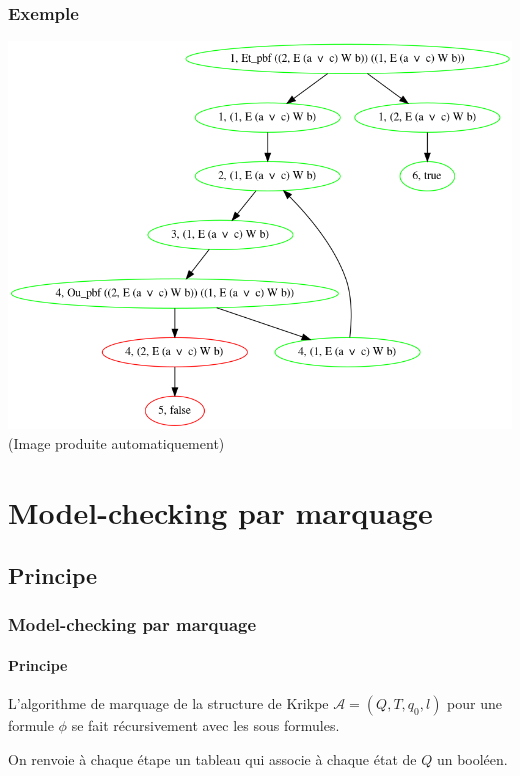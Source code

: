 \documentclass[11pt]{beamer}
\begin{document}
\begin{frame}
	\frametitle{Exemple}
	\begin{center}
    \includegraphics[scale=0.325]{imgs/g2-AXEa+cWb.png}\\
    (Image produite automatiquement)
	\end{center}
\end{frame}

\section{Model-checking par marquage}
\subsection{Principe}
\begin{frame}
    \frametitle{Model-checking par marquage}
    \framesubtitle{Principe}
    L'algorithme de marquage de la structure de Krikpe $\mathcal{A} = (Q, T, q_0, l)$ pour une formule $\phi$ se fait récursivement avec les sous formules.\\\bigskip

    On renvoie à chaque étape un tableau qui associe à chaque état de $Q$ un booléen.
\end{frame}
\end{document}
